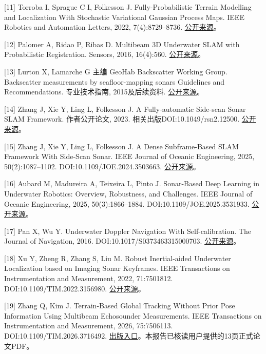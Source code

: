 {[}11{]} Torroba I, Sprague C I, Folkesson J. Fully-Probabilistic Terrain Modelling and Localization With Stochastic Variational Gaussian Process Maps. IEEE Robotics and Automation Letters, 2022, 7(4):8729--8736. \href{https://arxiv.org/abs/2203.10893}{公开来源}。

{[}12{]} Palomer A, Ridao P, Ribas D. Multibeam 3D Underwater SLAM with Probabilistic Registration. Sensors, 2016, 16(4):560. \href{https://pmc.ncbi.nlm.nih.gov/articles/PMC4851074/}{公开来源}。

{[}13{]} Lurton X, Lamarche G 主编 GeoHab Backscatter Working Group. Backscatter measurements by seafloor-mapping sonars Guidelines and Recommendations. 专业技术指南, 2015及后续资料. \href{https://geohab.org/backscatter-working-group/}{公开来源}。

{[}14{]} Zhang J, Xie Y, Ling L, Folkesson J. A Fully-automatic Side-scan Sonar SLAM Framework. 作者公开论文, 2023. 相关出版DOI:10.1049/rsn2.12500. \href{https://arxiv.org/abs/2304.01854}{公开来源}。

{[}15{]} Zhang J, Xie Y, Ling L, Folkesson J. A Dense Subframe-Based SLAM Framework With Side-Scan Sonar. IEEE Journal of Oceanic Engineering, 2025, 50(2):1087--1102. DOI:10.1109/JOE.2024.3503663. \href{https://arxiv.org/abs/2312.13802}{公开来源}。

{[}16{]} Aubard M, Madureira A, Teixeira L, Pinto J. Sonar-Based Deep Learning in Underwater Robotics: Overview, Robustness, and Challenges. IEEE Journal of Oceanic Engineering, 2025, 50(3):1866--1884. DOI:10.1109/JOE.2025.3531933. \href{https://arxiv.org/abs/2412.11840}{公开来源}。

{[}17{]} Pan X, Wu Y. Underwater Doppler Navigation With Self-calibration. The Journal of Navigation, 2016. DOI:10.1017/S0373463315000703. \href{https://arxiv.org/abs/1509.02054}{公开来源}。

{[}18{]} Xu Y, Zheng R, Zhang S, Liu M. Robust Inertial-aided Underwater Localization based on Imaging Sonar Keyframes. IEEE Transactions on Instrumentation and Measurement, 2022, 71:7501812. DOI:10.1109/TIM.2022.3156980. \href{https://arxiv.org/abs/2106.16032}{公开来源}。

{[}19{]} Zhang Q, Kim J. Terrain-Based Global Tracking Without Prior Pose Information Using Multibeam Echosounder Measurements. IEEE Transactions on Instrumentation and Measurement, 2026, 75:7506113. DOI:10.1109/TIM.2026.3716492. \href{https://doi.org/10.1109/TIM.2026.3716492}{出版入口}。本报告已核读用户提供的13页正式论文PDF。

